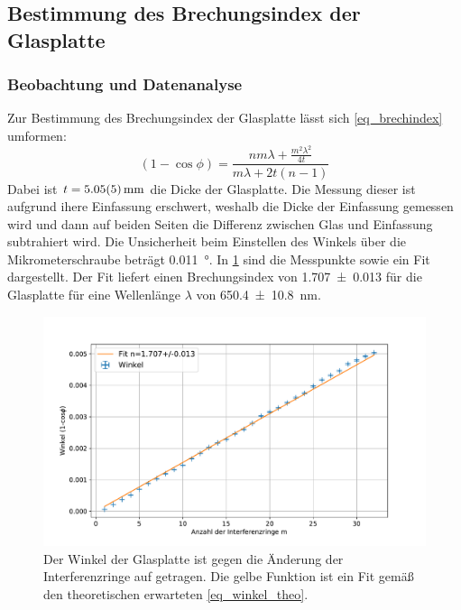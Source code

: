 \documentclass[
	a4paper,
	12pt,
	pagesize,
	ngerman
]{scrartcl}
\begin{document}
	\subsection{Bestimmung des Brechungsindex der Glasplatte}
	\subsubsection{Beobachtung und Datenanalyse}
	Zur Bestimmung des Brechungsindex der Glasplatte lässt sich \cref{eq_brechindex} umformen:
	\begin{equation}
		(1-\cos{\phi}) = \frac{nm\lambda+\frac{m^2\lambda^2}{4t}}{m\lambda+2t(n-1)}
		\label{eq_winkel_theo}
	\end{equation}
	Dabei ist $t= \SI{5.05+-0.05}{mm}$ die Dicke der Glasplatte.
	Die Messung dieser ist aufgrund ihere Einfassung erschwert, weshalb die Dicke der Einfassung gemessen wird und dann auf beiden Seiten die Differenz zwischen Glas und Einfassung subtrahiert wird.
	Die Unsicherheit beim Einstellen des Winkels über die Mikrometerschraube beträgt \SI{0.011}{\degree}.
	In \cref{fig_glas} sind die Messpunkte sowie ein Fit dargestellt. %
	Der Fit liefert einen Brechungsindex von \SI{1.707+-0.013}{} für die Glasplatte für eine Wellenlänge $\lambda$ von \SI{650.4+-10.8}{nm}. %

\begin{figure}[H]
		\includegraphics[width=\textwidth]{images/Glas.pdf}
		\centering
		\caption{Der Winkel der Glasplatte ist gegen die Änderung der Interferenzringe auf getragen.
		Die gelbe Funktion ist ein Fit gemäß den theoretischen erwarteten \cref{eq_winkel_theo}.}
		\label{fig_glas}
	\end{figure}
\end{document}

